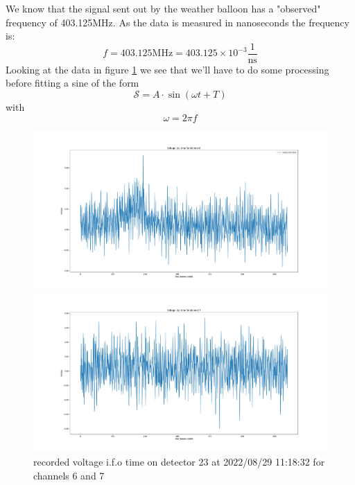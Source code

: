 \documentclass[11pt,a4paper,faculty=we,language=en,doctype=report]{cls/ugent-doc}
\begin{document}
We know that the signal sent out by the weather balloon has a "observed" frequency of
403.125MHz. As the data is measured in nanoseconds the frequency is:
\begin{equation}
	f = 403.125\text{MHz} = 403.125\times 10^{-3} \frac{1}{\text{ns}}
\end{equation}
Looking at the data in figure \ref{fig:voltage67} we see that we'll have to 
do some processing before fitting a sine of the form
\begin{equation}
	\mathcal{S} = A\cdot\sin\left(\omega t + T\right)
\end{equation}
with
\begin{equation}
	\omega = 2\pi f
\end{equation}
\begin{figure}
	\begin{minipage}{0.49\textwidth}
		\includegraphics[width=\textwidth]{RawChannel6.pdf}
	\end{minipage}
	\begin{minipage}{0.49\textwidth}
		\includegraphics[width=\textwidth]{RawChannel7.pdf}
	\end{minipage}
	\caption{recorded voltage i.f.o time on detector 23 at 2022/08/29 11:18:32 for
	channels 6 and 7}
	\label{fig:voltage67}
\end{figure}
\end{document}
